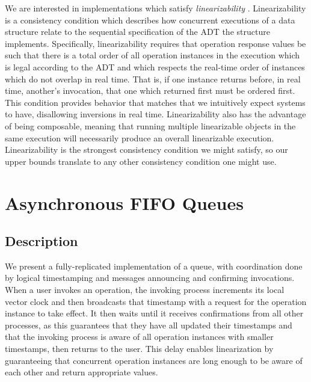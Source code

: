 \documentclass[a4paper,anonymous,USenglish]{lipics-v2021} %
\theoremstyle{definition}
\begin{document}
We are interested in implementations which satisfy \emph{linearizability} \cite{HerlihyWing90}.  Linearizability is a consistency condition which describes how concurrent executions of a data structure relate to the sequential specification of the ADT the structure implements.  Specifically, linearizability requires that operation response values be such that there is a total order of all operation instances in the execution which is legal according to the ADT and which respects the real-time order of instances which do not overlap in real time.  That is, if one instance returns before, in real time, another's invocation, that one which returned first must be ordered first.  This condition provides behavior that matches that we intuitively expect systems to have, disallowing inversions in real time.  Linearizability also has the advantage of being composable, meaning that running multiple linearizable objects in the same execution will necessarily produce an overall linearizable execution.  Linearizability is the strongest consistency condition we might satisfy, so our upper bounds translate to any other consistency condition one might use.


\section{Asynchronous FIFO Queues}

\subsection{Description}

We present a fully-replicated implementation of a queue, with coordination done by logical timestamping and messages announcing and confirming invocations.  When a user invokes an operation, the invoking process increments its local vector clock and then broadcasts that timestamp with a request for the operation instance to take effect.  It then waits until it receives confirmations from all other processes, as this guarantees that they have all updated their timestamps and that the invoking process is aware of all operation instances with smaller timestamps, then returns to the user.  This delay enables linearization by guaranteeing that concurrent operation instances are long enough to be aware of each other and return appropriate values.
\end{document}
